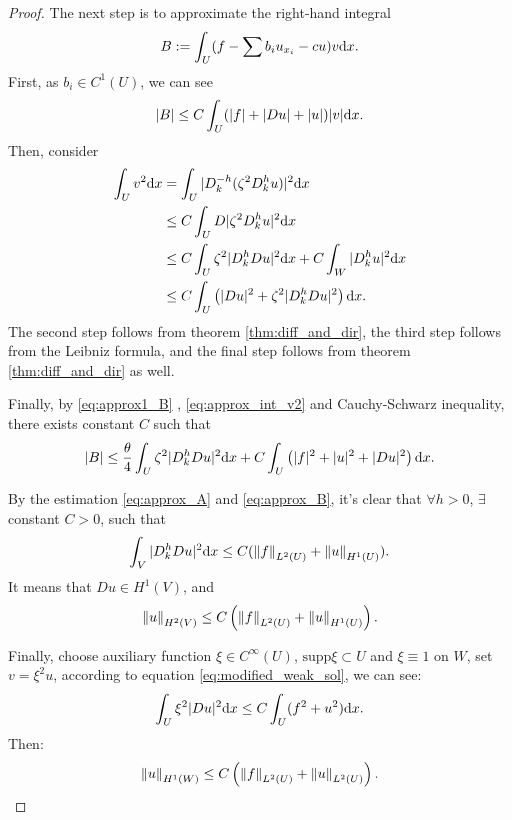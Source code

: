 \begin{proof}
    The next step is to approximate the right-hand integral 
    \begin{equation}
        \label{eq:integral_B}
        B:=\int_{U}(f-\sum b_{i}u_{x_{i}}-cu)v\mathrm{d} x.
    \end{equation}
    First, as $b_{i}\in C^{1}(U)$, we can see 
    \begin{equation}
        \label{eq:approx1_B}
        |B|\le C\int_{U}(|f|+|Du|+|u|)|v|\mathrm{d} x.
    \end{equation}
    Then, consider 
    \begin{equation}
        \label{eq:approx_int_v2}
        \begin{aligned}
            \int_{U}v^{2}\mathrm{d} x&=\int_{U}|D_{k}^{-h}(\zeta^{2}D_{k}^{h}u)|^{2}\mathrm{d} x\\
            &\le C\int_{U}D|\zeta^{2}D_{k}^{h}u|^{2}\mathrm{d} x\\
            &\le C\int_{U}\zeta^{2}|D_{k}^{h}Du|^{2}\mathrm{d} x+C\int_{W}|D_{k}^{h}u|^{2}\mathrm{d} x\\
            &\le C\int_{U}\left(|Du|^{2}+\zeta^{2}|D_{k}^{h}Du|^{2}\right)\mathrm{d} x.
        \end{aligned}
    \end{equation}
    The second step follows from theorem \ref{thm:diff_and_dir}, the third step follows from the Leibniz formula, and the final step follows from theorem \ref{thm:diff_and_dir} as well.
    
    Finally, by \eqref{eq:approx1_B} , \eqref{eq:approx_int_v2} and Cauchy-Schwarz inequality, there exists constant $C$ such that 
    \begin{equation}
        \label{eq:approx_B}
        |B|\le\frac{\theta}{4}\int_{U}\zeta^{2}|D_{k}^{h}Du|^{2}\mathrm{d} x+C\int_{U}\left(|f|^2+|u|^2+|Du|^2\right)\mathrm{d} x.
    \end{equation}
    
    By the estimation \eqref{eq:approx_A} and \eqref{eq:approx_B}, it's clear that $\forall h>0$, $\exists$ constant $C>0$, such that 
    \begin{equation}
        \int_{V}|D_{k}^{h}Du|^{2}\mathrm{d} x\le C(\left\|f\right\|_{L^{2}(U)}+\left\|u\right\|_{H^{1}(U)}).
    \end{equation}
    It means that $Du\in H^{1}(V)$, and 
    \begin{equation}
        \left\|u\right\|_{H^{2}(V)}\le C\left(\left\|f\right\|_{L^{2}(U)}+\left\|u\right\|_{H^{1}(U)}\right).
    \end{equation}

    Finally, choose auxiliary function $\xi\in C^{\infty}(U)$, $\text{supp}\xi\subset U$ and $\xi\equiv 1$ on $W$, set $v=\xi^{2}u$, according to equation \eqref{eq:modified_weak_sol}, we can see:
    \begin{equation}
        \int_{U}\xi^{2}|Du|^{2}\mathrm{d} x\le C\int_{U}(f^{2}+u^2)\mathrm{d} x.
    \end{equation}
    Then:
    \begin{equation}
        \label{eq:estimate_u_H1}
        \left\|u\right\|_{H^{1}(W)}\le C\left(\left\|f\right\|_{L^{2}(U)}+\left\|u\right\|_{L^{2}(U)}\right).
    \end{equation}
\end{proof}
